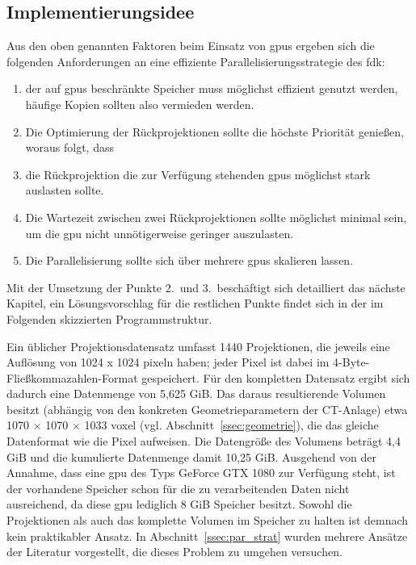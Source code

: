 \subsection{Implementierungsidee}\label{ssec:implementierungsidee}

Aus den oben genannten Faktoren beim Einsatz von \gls{gpu}s ergeben sich die folgenden Anforderungen an eine effiziente
Parallelisierungsstrategie des \gls{fdk}:

\begin{enumerate}
    \item der auf \gls{gpu}s beschränkte Speicher muss möglichst effizient genutzt werden, häufige Kopien sollten also
          vermieden werden.
    \item Die Optimierung der Rückprojektionen sollte die höchste Priorität genießen, woraus folgt, dass
    \item die Rückprojektion die zur Verfügung stehenden \gls{gpu}s möglichst stark auslasten sollte.
    \item Die Wartezeit zwischen zwei Rückprojektionen sollte möglichst minimal sein, um die \gls{gpu} nicht
          unnötigerweise geringer auszulasten.
    \item Die Parallelisierung sollte sich über mehrere \gls{gpu}s skalieren lassen.
\end{enumerate}

Mit der Umsetzung der Punkte 2.\ und 3.\ beschäftigt sich detailliert das nächste Kapitel, ein Lösungsvorschlag für
die restlichen Punkte findet sich in der im Folgenden skizzierten Programmstruktur.

Ein üblicher Projektionsdatensatz umfasst 1440 Projektionen, die jeweils eine Auflösung von 1024 x 1024 \gls{pixel}n
haben; jeder Pixel ist dabei im 4-Byte-Fließkommazahlen-Format gespeichert. Für den kompletten Datensatz ergibt sich
dadurch eine Datenmenge von 5,625 GiB. Das daraus resultierende Volumen besitzt (abhängig von den konkreten
Geometrieparametern der CT-Anlage) etwa 1070 $\times$ 1070 $\times$ 1033 \gls{voxel} (vgl.
Abschnitt~\ref{ssec:geometrie}), die das gleiche Datenformat wie die Pixel aufweisen. Die Datengröße des Volumens
beträgt 4,4 GiB und die kumulierte Datenmenge damit 10,25 GiB. Ausgehend von der Annahme, dass eine \gls{gpu} des Typs
GeForce GTX 1080 zur Verfügung steht, ist der vorhandene Speicher schon für die zu verarbeitenden Daten nicht
ausreichend, da diese \gls{gpu} lediglich 8 GiB Speicher besitzt. Sowohl die Projektionen als auch das komplette Volumen
im Speicher zu halten ist demnach kein praktikabler Ansatz. In Abschnitt~\ref{ssec:par_strat} wurden mehrere Ansätze der
Literatur vorgestellt, die dieses Problem zu umgehen versuchen.

